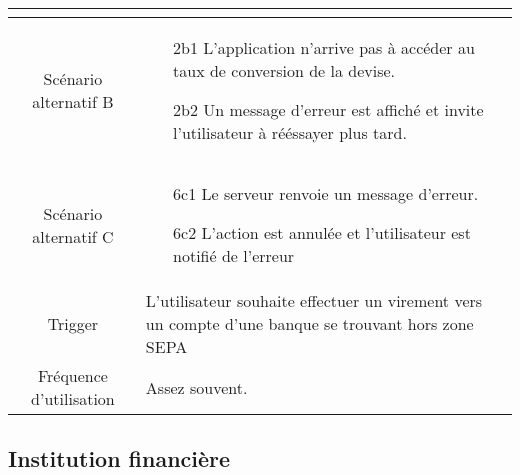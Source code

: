 \documentclass{article}
\begin{document}
\begin{table}[]
\begin{tabular}{|c|p{10cm}|}
\begin{itemize}
            \end{itemize}      \\
      \hline
      Scénario alternatif B&
            \begin{itemize}
               \item[2b1] L'application n'arrive pas à accéder au taux de conversion de la devise.
               \item[2b2] Un message d'erreur est affiché et invite l'utilisateur à rééssayer plus tard.  
            \end{itemize} \\
      \hline
      Scénario alternatif C&
            \begin{itemize}
               \item[6c1] Le serveur renvoie un message d'erreur.
               \item[6c2] L'action est annulée et l'utilisateur est notifié de l'erreur  
            \end{itemize}\\
      \hline
      Trigger&L'utilisateur souhaite effectuer un virement vers un compte d'une banque se trouvant hors zone SEPA\\
      \hline
      Fréquence d'utilisation&Assez souvent.\\
      \hline
   \end{tabular}
\end{table}
\newpage

\subsection{Institution financière}
\end{document}
